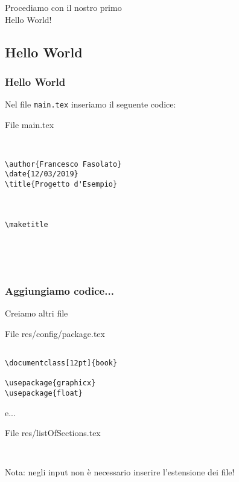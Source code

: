 \begin{frame}

\begin{center}
  \huge Procediamo con il nostro primo \\
  \huge Hello World! 
\end{center}

\end{frame}

\subsection{Hello World}
\begin{frame}[fragile]

\frametitle{Hello World}
 
Nel file \texttt{main.tex} inseriamo il seguente codice:

\begin{esempio}{File main.tex}
\begin{code}
\begin{verbatim}


\author{Francesco Fasolato}
\date{12/03/2019}
\title{Progetto d'Esempio}



\maketitle



 
\end{verbatim}
\end{code}
\end{esempio}

\end{frame}

\begin{frame}[fragile]
 
 \frametitle{Aggiungiamo codice...}
 
 Creiamo altri file

\begin{esempio}{File res/config/package.tex}
\begin{code}
\begin{verbatim}

\documentclass[12pt]{book}

\usepackage{graphicx}
\usepackage{float}
\end{verbatim}
\end{code}
\end{esempio}

 e...
 
\begin{esempio}{File res/listOfSections.tex}
\begin{code}
\begin{verbatim}


\end{verbatim}
\end{code}
\end{esempio}

Nota: negli input non è necessario inserire l'estensione dei file! 
\end{frame}

